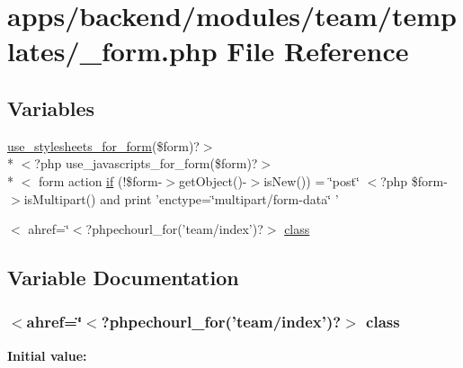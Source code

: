 \hypertarget{backend_2modules_2team_2templates_2__form_8php}{\section{apps/backend/modules/team/templates/\-\_\-form.php File Reference}
\label{backend_2modules_2team_2templates_2__form_8php}
}
\subsection*{Variables}
\begin{DoxyCompactItemize}
\item 
\hyperlink{live_2modules_2user_2templates_2__form_8php_a86bc4522fdbe625b07bc4a4d6eec3df7}{use\-\_\-stylesheets\-\_\-for\-\_\-form}(\$form)?$>$\\*
$<$?php use\-\_\-javascripts\-\_\-for\-\_\-form(\$form)?$>$\\*
$<$ form action \hyperlink{backend_2modules_2team_2templates_2__form_8php_ae30a307b320d8da5d9a945eaf68f7549}{if} (!\$form-\/$>$get\-Object()-\/$>$is\-New()) = \char`\"{}post\char`\"{} $<$?php \$form-\/$>$is\-Multipart() and print 'enctype=\char`\"{}multipart/form-\/data\char`\"{} '
\item 
$<$ ahref=\char`\"{}$<$?phpechourl\-\_\-for('team/index')?$>$ \hyperlink{backend_2modules_2team_2templates_2__form_8php_a9388c6d3d7100b4387bf7133f0227511}{class}
\end{DoxyCompactItemize}


\subsection{Variable Documentation}
\hypertarget{backend_2modules_2team_2templates_2__form_8php_a9388c6d3d7100b4387bf7133f0227511}{
\subsubsection[{class}]{\setlength{\rightskip}{0pt plus 5cm}$<$ahref=\char`\"{}$<$?phpechourl\-\_\-for('team/index')?$>$ class}}\label{backend_2modules_2team_2templates_2__form_8php_a9388c6d3d7100b4387bf7133f0227511}
{\bfseries Initial value\-:}


